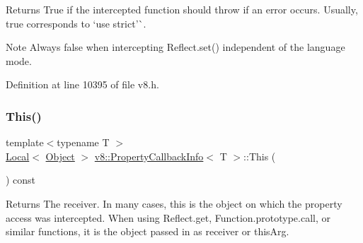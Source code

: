 \begin{DoxyReturn}{Returns}
True if the intercepted function should throw if an error occurs. Usually, {\ttfamily true} corresponds to `\textquotesingle{}use strict'\`{}.
\end{DoxyReturn}
\begin{DoxyNote}{Note}
Always {\ttfamily false} when intercepting {\ttfamily Reflect.\+set()} independent of the language mode. 
\end{DoxyNote}


Definition at line 10395 of file v8.\+h.

\mbox{\label{classv8_1_1PropertyCallbackInfo_af46300339d2f31d8dc84a06d74ed6c3c}} 
\subsubsection{\texorpdfstring{This()}{This()}}
{\footnotesize\ttfamily template$<$typename T $>$ \\
\mbox{\hyperlink{classv8_1_1Local}{Local}}$<$ \mbox{\hyperlink{classv8_1_1Object}{Object}} $>$ \mbox{\hyperlink{classv8_1_1PropertyCallbackInfo}{v8\+::\+Property\+Callback\+Info}}$<$ T $>$\+::This (\begin{DoxyParamCaption}{ }\end{DoxyParamCaption}) const}

\begin{DoxyReturn}{Returns}
The receiver. In many cases, this is the object on which the property access was intercepted. When using {\ttfamily Reflect.\+get}, {\ttfamily Function.\+prototype.\+call}, or similar functions, it is the object passed in as receiver or this\+Arg.
\end{DoxyReturn}

